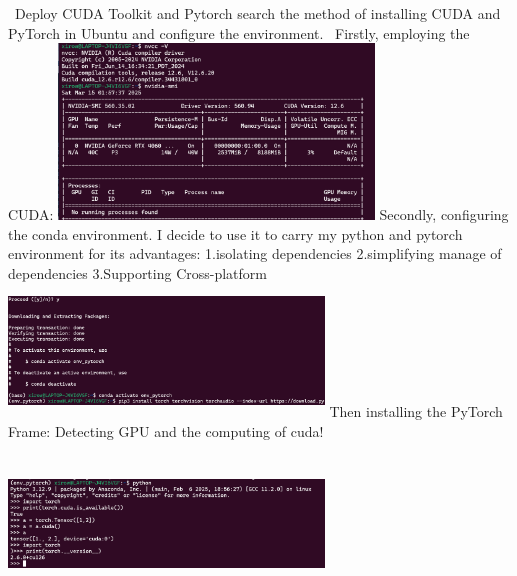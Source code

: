 \subsubsection{}~Deploy CUDA Toolkit and Pytorch\newline
search the method of installing CUDA and PyTorch in Ubuntu and configure the environment.\newline~
\newline Firstly, employing the CUDA:\newline
\newline \includegraphics[width=3.3in]{photograph/cuda.png}\newline
\newline Secondly, configuring the conda environment.
I decide to use it to carry my python and pytorch environment for its advantages:
1.isolating dependencies 2.simplifying manage of dependencies
3.Supporting Cross-platform\newline
~\newline ~\newline~\newline~\newline\includegraphics[width=3.3in,height=1.4in]{photograph/conda.png}\newline
\newline Then installing the PyTorch Frame:\newline
Detecting GPU and the computing of cuda!
\newline \includegraphics[width=3.3in,height=1.7in]{photograph/pytorch.png}\newline

